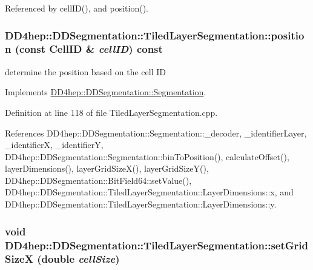 Referenced by cellID(), and position().\hypertarget{class_d_d4hep_1_1_d_d_segmentation_1_1_tiled_layer_segmentation_a4e29a7791d15e076601c3edd0e350fd0}{
\subsubsection[{position}]{ DD4hep::DDSegmentation::TiledLayerSegmentation::position (const {\bf CellID} \& {\em cellID}) const}}
\label{class_d_d4hep_1_1_d_d_segmentation_1_1_tiled_layer_segmentation_a4e29a7791d15e076601c3edd0e350fd0}


determine the position based on the cell ID 

Implements \hyperlink{class_d_d4hep_1_1_d_d_segmentation_1_1_segmentation_a594fe6d78667415855858d083b64acad}{DD4hep::DDSegmentation::Segmentation}.

Definition at line 118 of file TiledLayerSegmentation.cpp.

References DD4hep::DDSegmentation::Segmentation::\_\-decoder, \_\-identifierLayer, \_\-identifierX, \_\-identifierY, DD4hep::DDSegmentation::Segmentation::binToPosition(), calculateOffset(), layerDimensions(), layerGridSizeX(), layerGridSizeY(), DD4hep::DDSegmentation::BitField64::setValue(), DD4hep::DDSegmentation::TiledLayerSegmentation::LayerDimensions::x, and DD4hep::DDSegmentation::TiledLayerSegmentation::LayerDimensions::y.\hypertarget{class_d_d4hep_1_1_d_d_segmentation_1_1_tiled_layer_segmentation_aeb24630c5ce6f0510d516affa3fd798f}{
\subsubsection[{setGridSizeX}]{\setlength{\rightskip}{0pt plus 5cm}void DD4hep::DDSegmentation::TiledLayerSegmentation::setGridSizeX (double {\em cellSize})}}
\label{class_d_d4hep_1_1_d_d_segmentation_1_1_tiled_layer_segmentation_aeb24630c5ce6f0510d516affa3fd798f}


